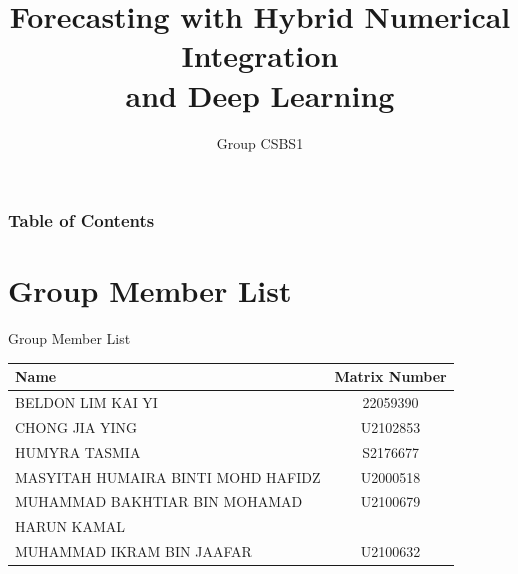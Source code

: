 \documentclass[10pt]{beamer}
\title[Forecasting Case Study]{Forecasting with Hybrid Numerical Integration \\ and Deep Learning}
\subtitle{Group CSBS1}
\institute[WID3015 Numerical Analysis]{Supervisor: Dr. Suzan J. Obaiys}
\date[Universiti Malaya]
\begin{document}
\begin{frame}
    \titlepage
\end{frame}

\begin{frame}
    \frametitle{Table of Contents}
    \tableofcontents
\end{frame}

\section{Group Member List}
\begin{frame}{Group Member List}
    \begin{table}
    \begin{center}
    \small
        \begin{tabular}{|l|c|}
            \hline
            \textbf{Name} & \textbf{Matrix Number} \\ \hline
            BELDON LIM KAI YI  & 22059390  \\ \hline
            CHONG JIA YING  & U2102853  \\ \hline
            HUMYRA TASMIA  & S2176677  \\ \hline
            MASYITAH HUMAIRA BINTI MOHD HAFIDZ  & U2000518  \\ \hline
            MUHAMMAD BAKHTIAR BIN MOHAMAD  & U2100679 \\
            HARUN KAMAL  &  \\ \hline
            MUHAMMAD IKRAM BIN JAAFAR  & U2100632  \\ \hline
        \end{tabular}
    \end{center}
    \end{table}
\end{frame}

\end{document}
